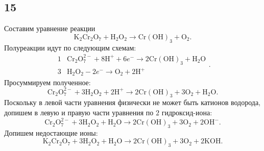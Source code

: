 \subsection{15}

Составим уравнение реакции
\[
\mathrm{K_2Cr_2O_7}+\mathrm{H_2O_2}\longrightarrow\mathrm{Cr(OH)_3}+\mathrm{O_2}.
\]
Полуреакции идут по следующим схемам:
\[
\begin{array}{r|l}
	1 & \mathrm{Cr_2O_7^{2-}}+8\mathrm{H^+}+6e^-\longrightarrow2\mathrm{Cr(OH)_3}+\mathrm{H_2O} \\
	3 & \mathrm{H_2O_2}-2e^-\longrightarrow\mathrm{O_2}+2\mathrm{H^+}
\end{array}.
\]
Просуммируем полученное:
\[
\mathrm{Cr_2O_7^{2-}}+3\mathrm{H_2O_2}+2\mathrm{H^+}\longrightarrow2\mathrm{Cr(OH)_3}+3\mathrm{O_2}+\mathrm{H_2O}.
\]
Поскольку в левой части уравнения физически не может быть катионов водорода, допишем в левую и правую части уравнения по $2$ гидроксид-иона:
\[
\mathrm{Cr_2O_7^{2-}}+3\mathrm{H_2O_2}+\mathrm{H_2O}\longrightarrow2\mathrm{Cr(OH)_3}+3\mathrm{O_2}+2\mathrm{OH^-}.
\]
Допишем недостающие ионы:
\[
\mathrm{K_2Cr_2O_7}+3\mathrm{H_2O_2}+\mathrm{H_2O}\longrightarrow2\mathrm{Cr(OH)_3}+3\mathrm{O_2}+2\mathrm{KOH}.
\]